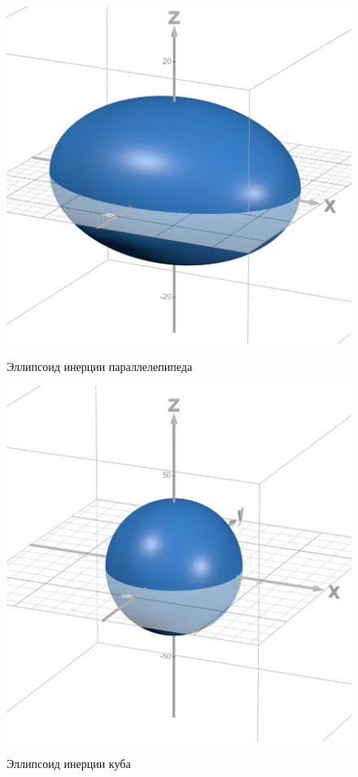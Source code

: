 \documentclass[a4paper,12pt]{article} %
\begin{document}
\begin{enumerate}
\begin{figure} [h] \center
	\includegraphics[scale=0.5]{./124/elipse.png}
	\label{pic:4} \caption[Рис. 4]{Эллипсоид инерции параллелепипеда}
	\includegraphics[scale=0.5]{./124/elipse 2.png}
	\label{pic:5} \caption[Рис. 5]{Эллипсоид инерции куба}
\end{figure}




\end{enumerate}
\end{document}
